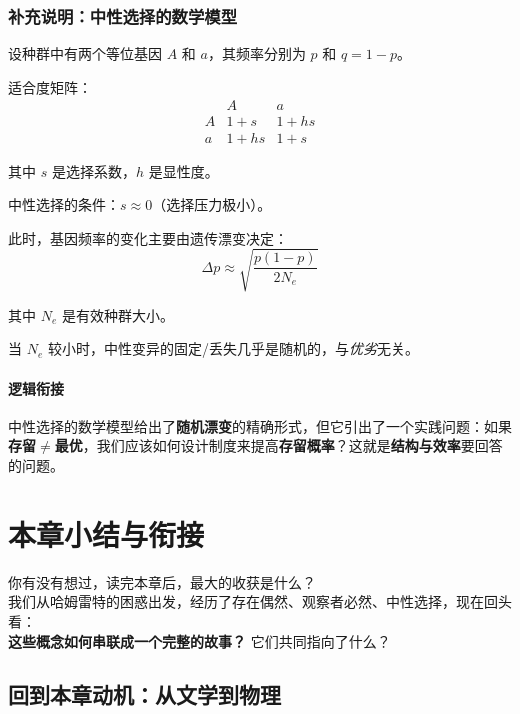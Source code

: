 \documentclass[../main.tex]{subfiles}
\begin{document}
	\subsubsection*{补充说明：中性选择的数学模型}
	\begin{tcolorbox}[
		colback=gray!5,
		colframe=gray!40,
		title=\small \textit{严谨推导（可跳过）},
		fonttitle=\bfseries
		]
		\small
		设种群中有两个等位基因 $A$ 和 $a$，其频率分别为 $p$ 和 $q=1-p$。

		适合度矩阵：
		\[
		\begin{array}{c|cc}
			& A & a \\
			\hline
			A & 1+s & 1+hs \\
			a & 1+hs & 1+s
		\end{array}
		\]

		其中 $s$ 是选择系数，$h$ 是显性度。

		中性选择的条件：$s \approx 0$（选择压力极小）。

		此时，基因频率的变化主要由遗传漂变决定：
		\[ \Delta p \approx \sqrt{\frac{p(1-p)}{2N_e}} \]

		其中 $N_e$ 是有效种群大小。

		当 $N_e$ 较小时，中性变异的固定/丢失几乎是随机的，与\textit{优劣}无关。
	\end{tcolorbox}

	\paragraph*{逻辑衔接}
	中性选择的数学模型给出了\textbf{随机漂变}的精确形式，但它引出了一个实践问题：如果\textbf{存留$\neq$最优}，我们应该如何设计制度来提高\textbf{存留概率}？这就是\textbf{结构与效率}要回答的问题。

	\section{本章小结与衔接}

	\begin{readingnote}
		你有没有想过，读完本章后，最大的收获是什么？\\
		我们从哈姆雷特的困惑出发，经历了存在偶然、观察者必然、中性选择，现在回头看：\\
		\textbf{这些概念如何串联成一个完整的故事？} 它们共同指向了什么？
	\end{readingnote}

	\subsection{回到本章动机：从文学到物理}
\end{document}
